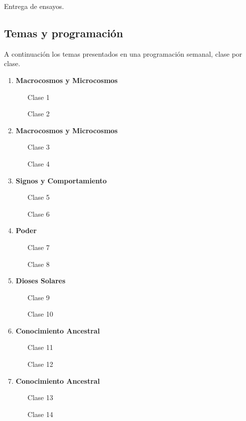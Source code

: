 \documentclass{report}
\begin{document}
Entrega de ensayos.

\subsection*{Temas y programaci\'on}

A continuaci\'on los temas presentados en una programaci\'on semanal,
clase por clase.

\begin{enumerate}
\item {\bf Macrocosmos y Microcosmos}
\begin{itemize}
\item[Clase 1]
\item[Clase 2]
\end{itemize}

\item {\bf Macrocosmos y Microcosmos}
\begin{itemize}
\item[Clase 3]
\item[Clase 4]
\end{itemize}

\item {\bf Signos y Comportamiento}
\begin{itemize}
\item[Clase 5]
\item[Clase 6]
\end{itemize}

\item {\bf Poder}
\begin{itemize}
\item[Clase 7]
\item[Clase 8]
\end{itemize}

\item {\bf Dioses Solares}
\begin{itemize}
\item[Clase 9]
\item[Clase 10]
\end{itemize}

\item {\bf Conocimiento Ancestral}
\begin{itemize}
\item[Clase 11]
\item[Clase 12]
\end{itemize}

\item {\bf Conocimiento Ancestral}
\begin{itemize}
\item[Clase 13]
\item[Clase 14]
\end{itemize}


\end{enumerate}
\end{document}
